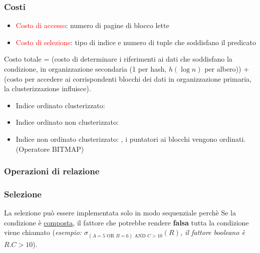 \documentclass[12pt, a4paper]{report}
\begin{document}
    \subsubsection{Costi}
    \begin{itemize}
        \item \textcolor{red}{Costo di accesso}: numero di pagine di blocco lette
        \item \textcolor{red}{Costo di selezione}: tipo di indice e numero di tuple che soddisfano il predicato
    \end{itemize}
    Costo totale = (costo di determinare i riferimenti ai dati che soddisfano la condizione, in organizzazione secondaria (1 per hash, $h(\log n)$ per albero)) + (costo per accedere ai
    corrispondenti blocchi dei
    dati in organizzazione
    primaria, la clusterizzazione influisce).
    \begin{itemize}
        \item Indice ordinato clusterizzato: 
        \item Indice ordinato non clusterizzato: 
        \item Indice non ordinato clusterizzato: , i puntatori ai blocchi vengono ordinati. (Operatore BITMAP)
    \end{itemize}
    \subsubsection{Operazioni di relazione}
    \subsubsection{Selezione}
    La selezione può essere implementata solo in modo sequenziale perchè  Se la condizione è \underline{composta}, il fattore che potrebbe rendere \textbf{falsa} tutta la condizione viene chiamato  (\textit{esempio: $\sigma_{(A=5 \text{ OR } B=6) \text{ AND } C>10}(R)$, il fattore booleano è $R.C>10$}).
\end{document}
